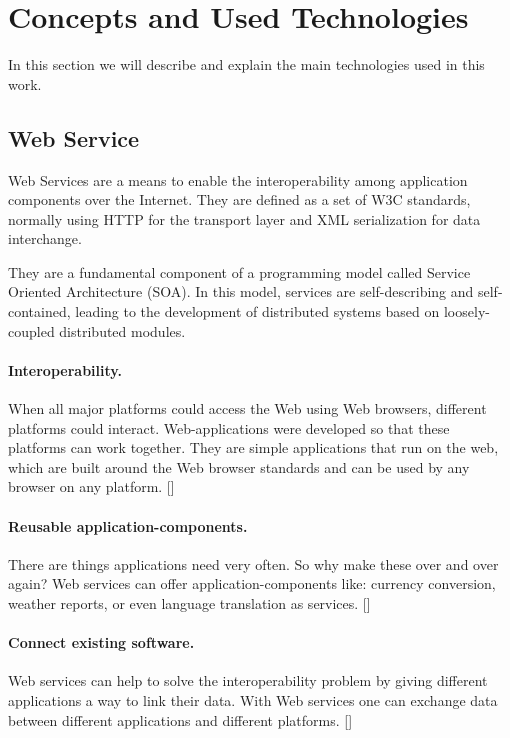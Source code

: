 \section{Concepts and Used Technologies}
In this section we will describe and explain the main technologies used in this work.

\subsection{Web Service}
Web Services are a means to enable the interoperability among application components over the Internet.  They are defined as a set of W3C standards, normally using HTTP for the transport layer and XML serialization for data interchange.

They are  a fundamental component of a programming model called Service Oriented Architecture (SOA). In this model, services are self-describing and self-contained, leading to the development of distributed systems based on loosely-coupled distributed modules.

\paragraph{Interoperability.}
When all major platforms could access the Web using Web browsers, different platforms could interact. Web-applications were developed so that these platforms can work together. They are simple applications that run on the web, which are built around the Web browser standards and can be used by any browser on any platform.  [\citet{WST}]

\paragraph{Reusable application-components.}
There are things applications need very often. So why make these over and over again? Web services can offer application-components like: currency conversion, weather reports, or even language translation as services.  [\citet{WST}]

\paragraph{Connect existing software.}
Web services can help to solve the interoperability problem by giving different applications a way to link their data. With Web services one can exchange data between different applications and different platforms. [\citet{WST}]


